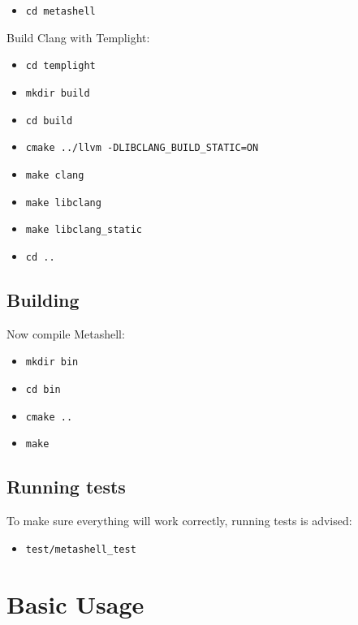 \begin{itemize}
    \item \lstinline$cd metashell$
\end{itemize}

Build Clang with Templight\cite{templight}:

\begin{itemize}
    \item \lstinline$cd templight$
    \item \lstinline$mkdir build$
    \item \lstinline$cd build$
    \item \lstinline$cmake ../llvm -DLIBCLANG_BUILD_STATIC=ON$
    \item \lstinline$make clang$
    \item \lstinline$make libclang$
    \item \lstinline$make libclang_static$
    \item \lstinline$cd ..$
\end{itemize}

\subsection{Building}

Now compile Metashell:

\begin{itemize}
    \item \lstinline$mkdir bin$
    \item \lstinline$cd bin$
    \item \lstinline$cmake ..$
    \item \lstinline$make$
\end{itemize}


\subsection{Running tests}

To make sure everything will work correctly, running tests is advised:

\begin{itemize}
    \item \lstinline$test/metashell_test$
\end{itemize}

\section{Basic Usage}

